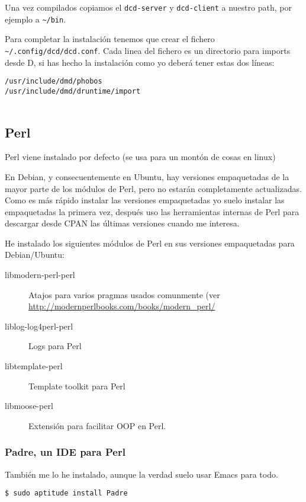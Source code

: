 Una vez compilados copiamos el \texttt{dcd-server} y \texttt{dcd-client}
a nuestro path, por ejemplo a \texttt{\textasciitilde{}/bin}.

Para completar la instalación tenemos que crear el fichero
\texttt{\textasciitilde{}/.config/dcd/dcd.conf}. Cada linea del fichero
es un directorio para imports desde D, si has hecho la instalación como
yo deberá tener estas dos líneas:

\begin{verbatim}
/usr/include/dmd/phobos
/usr/include/dmd/druntime/import
        
\end{verbatim}

\subsection{Perl}\label{perl}

Perl viene instalado por defecto (se usa para un montón de cosas en
linux)

En Debian, y consecuentemente en Ubuntu, hay versiones empaquetadas de
la mayor parte de los módulos de Perl, pero no estarán completamente
actualizadas. Como es más rápido instalar las versiones empaquetadas yo
suelo instalar las empaquetadas la primera vez, después uso las
herramientas internas de Perl para descargar desde CPAN las últimas
versiones cuando me interesa.

He instalado los siguientes módulos de Perl en sus versiones
empaquetadas para Debian/Ubuntu:

\begin{description}
\item[libmodern-perl-perl]
Atajos para varios pragmas usados comunmente (ver
\url{http://modernperlbooks.com/books/modern_perl/}
\item[liblog-log4perl-perl]
Logs para Perl
\item[libtemplate-perl]
Template toolkit para Perl
\item[libmoose-perl]
Extensión para facilitar OOP en Perl.
\end{description}

\subsubsection{Padre, un IDE para Perl}\label{padre-un-ide-para-perl}

También me lo he instalado, aunque la verdad suelo usar Emacs para todo.

\begin{verbatim}
$ sudo aptitude install Padre
        
\end{verbatim}

